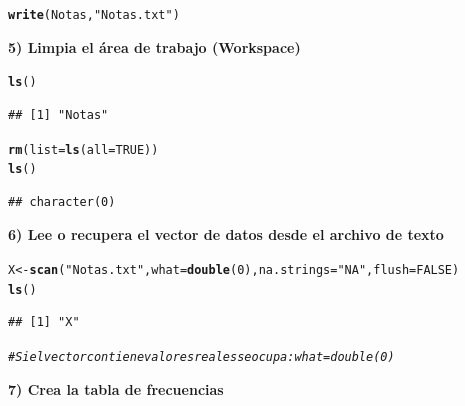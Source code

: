\documentclass[12pt,letterpaper]{article}\usepackage[]{graphicx}\usepackage[]{color}
\makeatletter
\newcommand{\hlnum}[1]{\textcolor[rgb]{0.686,0.059,0.569}{#1}}%
\newcommand{\hlstr}[1]{\textcolor[rgb]{0.192,0.494,0.8}{#1}}%
\newcommand{\hlcom}[1]{\textcolor[rgb]{0.678,0.584,0.686}{\textit{#1}}}%
\newcommand{\hlstd}[1]{\textcolor[rgb]{0.345,0.345,0.345}{#1}}%
\newcommand{\hlkwb}[1]{\textcolor[rgb]{0.69,0.353,0.396}{#1}}%
\newcommand{\hlkwc}[1]{\textcolor[rgb]{0.333,0.667,0.333}{#1}}%
\newcommand{\hlkwd}[1]{\textcolor[rgb]{0.737,0.353,0.396}{\textbf{#1}}}%
\newenvironment{kframe}{%
 \def\at@end@of@kframe{}%
 \ifinner\ifhmode%
  \def\at@end@of@kframe{\end{minipage}}%
  \begin{minipage}{\columnwidth}%
 \fi\fi%
 \def\FrameCommand##1{\hskip\@totalleftmargin \hskip-\fboxsep
 \colorbox{shadecolor}{##1}\hskip-\fboxsep
     \hskip-\linewidth \hskip-\@totalleftmargin \hskip\columnwidth}%
 \MakeFramed {\advance\hsize-\width
   \@totalleftmargin\z@ \linewidth\hsize
   \@setminipage}}%
 {\par\unskip\endMakeFramed%
 \at@end@of@kframe}
\newenvironment{knitrout}{}{} %
\makeatother
\begin{document}
\begin{knitrout}
\color{fgcolor}\begin{kframe}
\begin{alltt}
\hlkwd{write}\hlstd{(Notas,} \hlstr{"Notas.txt"}\hlstd{)}
\end{alltt}
\end{kframe}
\end{knitrout}
\textbf{5) Limpia el \'area de trabajo (Workspace)}
\begin{knitrout}
\color{fgcolor}\begin{kframe}
\begin{alltt}
\hlkwd{ls}\hlstd{()}
\end{alltt}
\begin{verbatim}
## [1] "Notas"
\end{verbatim}
\begin{alltt}
\hlkwd{rm}\hlstd{(}\hlkwc{list}\hlstd{=}\hlkwd{ls}\hlstd{(}\hlkwc{all}\hlstd{=}\hlnum{TRUE}\hlstd{))}
\hlkwd{ls}\hlstd{()}
\end{alltt}
\begin{verbatim}
## character(0)
\end{verbatim}
\end{kframe}
\end{knitrout}
\textbf{6) Lee o recupera el vector de datos desde el archivo de texto}
\begin{knitrout}
\color{fgcolor}\begin{kframe}
\begin{alltt}
\hlstd{X} \hlkwb{<-} \hlkwd{scan}\hlstd{(}\hlstr{"Notas.txt"}\hlstd{,} \hlkwc{what} \hlstd{=} \hlkwd{double}\hlstd{(}\hlnum{0}\hlstd{),} \hlkwc{na.strings} \hlstd{=} \hlstr{"NA"}\hlstd{,} \hlkwc{flush}\hlstd{=}\hlnum{FALSE}\hlstd{)}
\hlkwd{ls}\hlstd{()}
\end{alltt}
\begin{verbatim}
## [1] "X"
\end{verbatim}
\begin{alltt}
\hlcom{# Si el vector contiene valores reales se ocupa: what = double(0)}
\end{alltt}
\end{kframe}
\end{knitrout}
\textbf{7) Crea la tabla de frecuencias}
\end{document}
